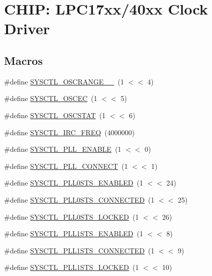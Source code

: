 \hypertarget{group__CLOCK__17XX__40XX}{\section{C\-H\-I\-P\-: L\-P\-C17xx/40xx Clock Driver}
\label{group__CLOCK__17XX__40XX}
}
\subsection*{Macros}
\begin{DoxyCompactItemize}
\item 
\#define \hyperlink{group__CLOCK__17XX__40XX_gaf04369ab801acde194d9ffa65437364b}{S\-Y\-S\-C\-T\-L\-\_\-\-O\-S\-C\-R\-A\-N\-G\-E\-\_\-\_}~(1 $<$$<$ 4)
\item 
\#define \hyperlink{group__CLOCK__17XX__40XX_ga590cc793271161c9b49e27345956b527}{S\-Y\-S\-C\-T\-L\-\_\-\-O\-S\-C\-E\-C}~(1 $<$$<$ 5)
\item 
\#define \hyperlink{group__CLOCK__17XX__40XX_gae0252af1bba39952df3137fc471ae395}{S\-Y\-S\-C\-T\-L\-\_\-\-O\-S\-C\-S\-T\-A\-T}~(1 $<$$<$ 6)
\item 
\#define \hyperlink{group__CLOCK__17XX__40XX_gadec816f1cc26d1b3c4a954d5e791e9c0}{S\-Y\-S\-C\-T\-L\-\_\-\-I\-R\-C\-\_\-\-F\-R\-E\-Q}~(4000000)
\item 
\#define \hyperlink{group__CLOCK__17XX__40XX_ga78f6b62e70d59854ada7a72d6a01893d}{S\-Y\-S\-C\-T\-L\-\_\-\-P\-L\-L\-\_\-\-E\-N\-A\-B\-L\-E}~(1 $<$$<$ 0)
\item 
\#define \hyperlink{group__CLOCK__17XX__40XX_ga4e33171ff00818ed7a62cd953eadc725}{S\-Y\-S\-C\-T\-L\-\_\-\-P\-L\-L\-\_\-\-C\-O\-N\-N\-E\-C\-T}~(1 $<$$<$ 1)
\item 
\#define \hyperlink{group__CLOCK__17XX__40XX_gac41b20558f47e27cbe618dbe33db470a}{S\-Y\-S\-C\-T\-L\-\_\-\-P\-L\-L0\-S\-T\-S\-\_\-\-E\-N\-A\-B\-L\-E\-D}~(1 $<$$<$ 24)
\item 
\#define \hyperlink{group__CLOCK__17XX__40XX_ga6ed64c74717a9360b3f6ee8756c5cfd0}{S\-Y\-S\-C\-T\-L\-\_\-\-P\-L\-L0\-S\-T\-S\-\_\-\-C\-O\-N\-N\-E\-C\-T\-E\-D}~(1 $<$$<$ 25)
\item 
\#define \hyperlink{group__CLOCK__17XX__40XX_ga6facab939c95a89e63fc07b960f0348a}{S\-Y\-S\-C\-T\-L\-\_\-\-P\-L\-L0\-S\-T\-S\-\_\-\-L\-O\-C\-K\-E\-D}~(1 $<$$<$ 26)
\item 
\#define \hyperlink{group__CLOCK__17XX__40XX_gabb0301239d0c370ef97a1e9463f9d17d}{S\-Y\-S\-C\-T\-L\-\_\-\-P\-L\-L1\-S\-T\-S\-\_\-\-E\-N\-A\-B\-L\-E\-D}~(1 $<$$<$ 8)
\item 
\#define \hyperlink{group__CLOCK__17XX__40XX_ga0193028000d11642d35e6e69776258ed}{S\-Y\-S\-C\-T\-L\-\_\-\-P\-L\-L1\-S\-T\-S\-\_\-\-C\-O\-N\-N\-E\-C\-T\-E\-D}~(1 $<$$<$ 9)
\item 
\#define \hyperlink{group__CLOCK__17XX__40XX_ga4885e14837c3f1cc44d84e24805f382f}{S\-Y\-S\-C\-T\-L\-\_\-\-P\-L\-L1\-S\-T\-S\-\_\-\-L\-O\-C\-K\-E\-D}~(1 $<$$<$ 10)
\end{DoxyCompactItemize}
